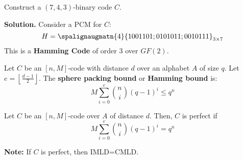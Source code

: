 \begin{exbox}
    \begin{example}
        Construct a $ (7,4,3) $-binary code $ C $.

        \textbf{Solution.}
        Consider a PCM for $ C $:
        \[H= \spalignaugmatn{4}{
                1 0 0 1 1 0 1;
                0 1 0 1 0 1 1;
                0 0 1 0 1 1 1}_{3\times{} 7} \]
        This is a \textbf{Hamming Code} of order $ 3 $ over $ GF(2) $.
    \end{example}
\end{exbox}

\begin{defbox}
    \begin{definition}
        Let $ C $ be an $ [n,M] $-code with distance $ d $ over an
        alphabet $ A $ of size $ q $. Let $ e=\left\lfloor \frac{d-1}{2} \right\rfloor $.
        The \textbf{sphere packing bound} or \textbf{Hamming bound} is:
        \[ M \sum\limits_{i=0}^{e} \binom{n}{i}(q-1)^i\leqslant q^n \]
    \end{definition} \end{defbox}

\begin{defbox}
    \begin{definition}
        Let $ C $ be an $ [n,M] $-code over $ A $ of distance $ d $. Then,
        $ C $ is perfect if
        \[ M \sum\limits_{i=0}^{e} \binom{n}{i}(q-1)^i = q^n \]
    \end{definition} \end{defbox}

\textbf{Note:} If $ C $ is perfect, then IMLD=CMLD\@.
